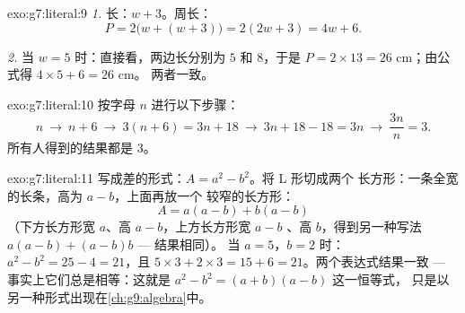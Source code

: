 \begin{solution}{exo:g7:literal:9}
\emph{1.} 长：$w + 3$。周长：
\[
P = 2\bigl(w + (w + 3)\bigr) = 2(2w + 3) = 4w + 6 .
\]

\emph{2.} 当 $w = 5$ 时：直接看，两边长分别为 $5$ 和 $8$，于是
$P = 2 \times 13 = 26$ cm；由公式得 $4 \times 5 + 6 = 26$ cm。
两者一致。
\end{solution}

\begin{solution}{exo:g7:literal:10}
按字母 $n$ 进行以下步骤：
\[
n \ \to\ n + 6 \ \to\ 3(n + 6) = 3n + 18 \ \to\ 3n + 18 - 18 = 3n
\ \to\ \frac{3n}{n} = 3 .
\]
所有人得到的结果都是 $3$。
\end{solution}

\begin{solution}{exo:g7:literal:11}
写成差的形式：$A = a^2 - b^2$。将 L 形切成两个
长方形：一条全宽的长条，高为 $a - b$，上面再放一个
较窄的长方形：
\[
A = a(a - b) + b(a - b)
\]
（下方长方形宽 $a$、高 $a - b$，上方长方形宽 $a - b$
、高 $b$，得到另一种写法 $a(a-b) + (a-b)b$ --- 结果相同）。
当 $a = 5$，$b = 2$ 时：$a^2 - b^2 = 25 - 4 = 21$，且
$5 \times 3 + 2 \times 3 = 15 + 6 = 21$。两个表达式结果一致 ---
事实上它们总是相等：这就是 $a^2 - b^2 = (a + b)(a - b)$ 这一恒等式，
只是以另一种形式出现在\cref{ch:g9:algebra}中。
\end{solution}

